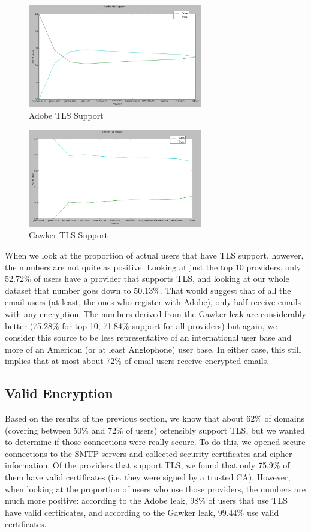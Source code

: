 \begin{figure}
    \includegraphics[width=3.0in]{images/adobe_tls.png}
    \caption{Adobe TLS Support}
    \label{adobe_tls}
\end{figure}

\begin{figure}
    \includegraphics[width=3.0in]{images/gawker_tls.png}
    \caption{Gawker TLS Support}
    \label{gawker_tls}
\end{figure}

When we look at the proportion of actual users that have TLS support, however, 
the numbers are not quite as positive.  Looking at just the top 10 providers, 
only 52.72\% of users have a provider that supports TLS, and looking at our whole 
dataset that number goes down to 50.13\%.  That would suggest that of all the 
email users (at least, the ones who register with Adobe), only half receive 
emails with any encryption.  The numbers derived from the Gawker leak are 
considerably better (75.28\% for top 10, 71.84\% support for all providers) but 
again, we consider this source to be less representative of an international 
user base and more of an American (or at least Anglophone) user base.  In either 
case, this still implies that at most about 72\% of email users receive encrypted 
emails.

\subsection{Valid Encryption}
Based on the results of the previous section, we know that about 62\% of domains 
(covering between 50\% and 72\% of users) ostensibly support TLS, but we wanted to 
determine if those connections were really secure.  To do this, we opened secure 
connections to the SMTP servers and collected security certificates and cipher 
information.  Of the providers that support TLS, we found that only 75.9\% of 
them have valid certificates (i.e. they were signed by a trusted CA).  However, 
when looking at the proportion of users who use those providers, the numbers are 
much more positive: according to the Adobe leak, 98\% of users that use TLS have 
valid certificates, and according to the Gawker leak, 99.44\% use valid 
certificates.


